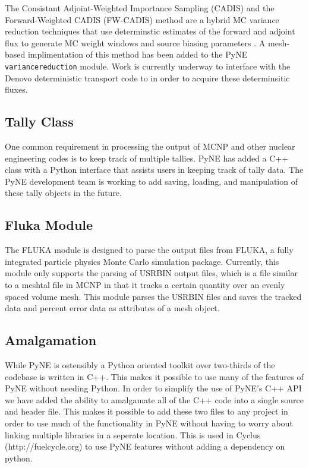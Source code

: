 \documentclass{anstrans}
\begin{document}
The Consistant Adjoint-Weighted Importance Sampling (CADIS) and the
Forward-Weighted CADIS (FW-CADIS) method are a hybrid MC variance reduction
techniques that use determinstic estimates of the forward and adjoint flux to
generate MC weight windows and source biasing parameters
\cite{haghighat_monte_2003}. A mesh-based implimentation of this method has
been added to the PyNE \texttt{variancereduction} module. Work is currently
underway to interface with the Denovo \cite{Denovo} deterministic transport
code to in order to acquire these determinsitic fluxes.


\subsection{Tally Class}

One common requirement in processing the output of MCNP and other nuclear
engineering codes is to keep track of multiple tallies. PyNE has added a
C++ class with a Python interface that assists users in keeping track of
tally data. The PyNE development team is working to add saving, loading,
and manipulation of these tally objects in the future.

\subsection{Fluka Module}

The FLUKA module is designed to parse the output files from FLUKA, a fully 
integrated particle physics Monte Carlo simulation package. Currently, 
this module only supports the parsing of USRBIN output files, which is 
a file similar to a meshtal file in MCNP in that it tracks a certain 
quantity over an evenly spaced volume mesh. This module parses the USRBIN 
files and saves the tracked data and percent error data as attributes of 
a mesh object.

\subsection{Amalgamation}

While PyNE is ostensibly a Python oriented toolkit over two-thirds 
of the codebase is written in C++. This makes it possible to use many 
of the features of PyNE without needing Python. In order to simplify 
the use of PyNE's C++ API we have added the ability to amalgamate all 
of the C++ code into a single source and header file. This makes it 
possible to add these two files to any project in order to use much of the 
functionality in PyNE without having to worry about linking multiple 
libraries in a seperate location. This is used in Cyclus (http://fuelcycle.org)
 to use PyNE features without adding a dependency on python.
\end{document}
